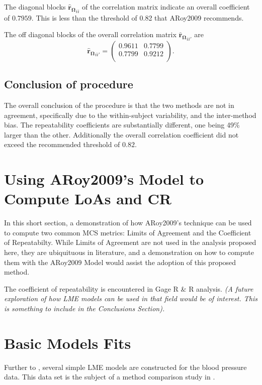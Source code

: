 \documentclass[12pt, a4paper]{report}
\theoremstyle{plain}
\theoremstyle{definition}
\theoremstyle{remark}
\begin{document}
	The  diagonal blocks $\boldsymbol{\hat{r}_{\Omega}}_{ii}$ of the correlation matrix indicate an overall coefficient of $0.7959$.
	This is less than the threshold of 0.82 that ARoy2009 recommends.
	
	The off diagonal blocks of the overall correlation matrix $\boldsymbol{\hat{r}_{\Omega}}_{ii'}$ are
	\begin{equation}
	\boldsymbol{\hat{r}_{\Omega}}_{ii'} = \left( \begin{array}{cc}
	0.9611  & 0.7799  \\
	0.7799  & 0.9212  \\
	\end{array}\right).
	\end{equation}
	
	\subsection{Conclusion of procedure}
	The overall conclusion of the procedure is that the two methods are not in agreement, specifically due to the within-subject variability, and the inter-method bias. The repeatability coefficients are substantially different, one being 49\% larger than the other. Additionally the overall correlation coefficient did not exceed the recommended threshold of $0.82$.
	
	\newpage
	
	
	\section*{Using ARoy2009's Model to Compute LoAs and CR }
	
	In this short section, a demonstration of how ARoy2009's technique can be used to compute two common MCS metrics: Limits of Agreement and the Coefficient of Repeatabilty. While Limits of Agreement are not used in the analysis proposed here, they are ubiquituous in literature, and a demonstration on how to compute them with the ARoy2009 Model would assist the adoption of this proposed method.
	
	The coefficient of repeatability is encountered in Gage R \& R analysis. \textit{(A future exploration of how LME models can be used in that field would be of interest. This is something to include in the Conclusions Section).}
	\section{Basic Models Fits}
	Further to \citet{PB}, several simple LME models are constructed
	for the blood pressure data. This data set is the subject of a
	method comparison study in \citet{BA99}.
	
\end{document}
